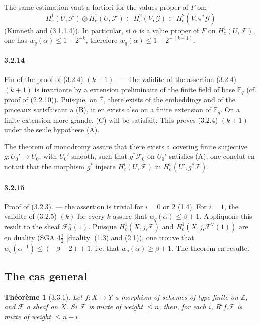 \documentclass[12pt,a4paper]{article}
\theoremstyle{plain}
\newtheorem{theorem}{Th\'eor\`eme}[section]
\theoremstyle{definition}
\theoremstyle{remark}
\newcommand{\FF}{{\mathbb{F}}}
\newcommand{\ZZ}{{\mathbb{Z}}}
\begin{document}
The same estimation vaut a fortiori for the values proper of $F$ on:
\[ H_c^1(U, \mathscr{F}) \otimes H_c^1(U, \mathscr{F}) \subset H_c^2(V, \mathscr{G}) \subset H_c^2(\widetilde{V}, \pi^*\mathscr{G}) \]
(K\"unneth and (3.1.1.4)). In particular, si $\alpha$ is a value proper of $F$ on $H_c^1(U, \mathscr{F})$, one has $w_q(\alpha) \leq 1 + 2^{-k}$, therefore $w_q(\alpha) \leq 1 + 2^{-(k+1)}$.

\paragraph{3.2.14}
Fin of the proof of (3.2.4) $(k+1)$. --- The validite of the assertion (3.2.4) $(k+1)$ is invariante by a extension preliminaire of the finite field of base $\FF_q$ (cf. proof of (2.2.10)). Puisque, on $\overline{\FF}$, there exists of the embeddings and of the pinceaux satisfaisant a (B), it en exists also on a finite extension of $\FF_q$. On a finite extension more grande, (C) will be satisfait. This proves (3.2.4) $(k+1)$ under the seule hypothese (A).

The theorem of monodromy assure that there exists a covering finite surjective $g : U_0' \to U_0$, with $U_0'$ smooth, such that $g^*\mathscr{F}_0$ on $U_0'$ satisfies (A); one conclut en notant that the morphism $g^*$ injecte $H_c^i(U, \mathscr{F})$ in $H_c^i(U', g^*\mathscr{F})$.


\paragraph{3.2.15}
Proof of (3.2.3). --- the assertion is trivial for $i = 0$ or $2$ (1.4). For $i = 1$, the validite of (3.2.5) $(k)$ for every $k$ assure that $w_q(\alpha) \leq \beta + 1$. Appliquons this result to the sheaf $\mathscr{F}_0^\vee(1)$. Puisque $H_c^1(X, j_!\mathscr{F})$ and $H_c^1(X, j_!\mathscr{F}^\vee(1))$ are en duality (SGA 4$\frac{1}{2}$ [duality] (1.3) and (2.1)), one trouve that $w_q(\alpha^{-1}) \leq (-\beta - 2) + 1$, i.e. that $w_q(\alpha) \geq \beta + 1$. The theorem en resulte.


\subsection{The cas general}

\begin{theorem}[3.3.1]
Let $f : X \to Y$ a morphism of schemes of type finite on $\ZZ$, and $\mathscr{F}$ a sheaf on $X$. Si $\mathscr{F}$ is mixte of weight $\leq n$, then, for each $i$, $R^i f_! \mathscr{F}$ is mixte of weight $\leq n + i$.
\end{theorem}
\end{document}
